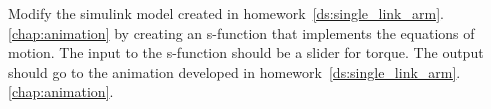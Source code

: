 Modify the simulink model created in homework~\ref{ds:single_link_arm}.\ref{chap:animation} by creating an s-function that implements the equations of motion.  The input to the s-function should be a slider for torque.  The output should go to the animation developed in homework~\ref{ds:single_link_arm}.\ref{chap:animation}.
